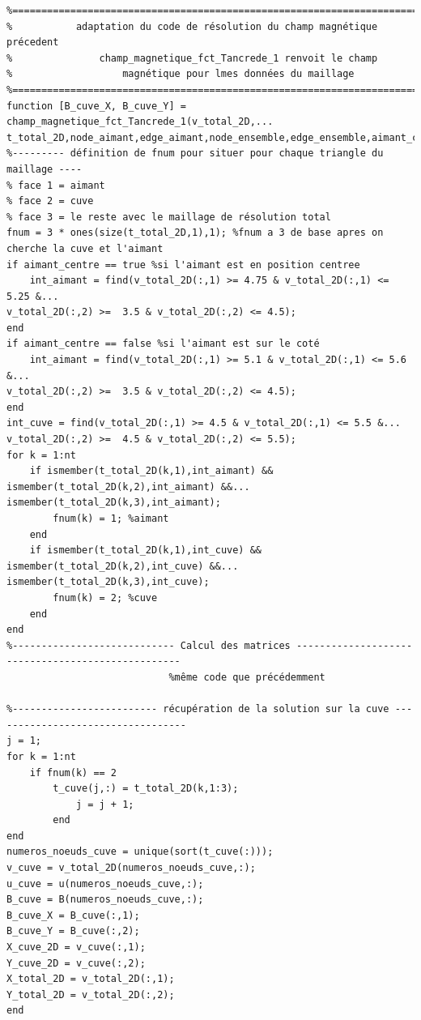 \documentclass[a4paper,12pt,titlepage]{report}
\begin{document}
\begin{onehalfspace}
\begin{appendix}
\begin{verbatim}
%==============================================================================
% 			adaptation du code de résolution du champ magnétique précedent
%				champ_magnetique_fct_Tancrede_1 renvoit le champ 
%					magnétique pour lmes données du maillage
%==============================================================================
function [B_cuve_X, B_cuve_Y] = champ_magnetique_fct_Tancrede_1(v_total_2D,...
t_total_2D,node_aimant,edge_aimant,node_ensemble,edge_ensemble,aimant_centre)
%--------- définition de fnum pour situer pour chaque triangle du maillage ----
% face 1 = aimant
% face 2 = cuve
% face 3 = le reste avec le maillage de résolution total
fnum = 3 * ones(size(t_total_2D,1),1); %fnum a 3 de base apres on cherche la cuve et l'aimant
if aimant_centre == true %si l'aimant est en position centree
    int_aimant = find(v_total_2D(:,1) >= 4.75 & v_total_2D(:,1) <= 5.25 &...
v_total_2D(:,2) >=  3.5 & v_total_2D(:,2) <= 4.5);
end
if aimant_centre == false %si l'aimant est sur le coté
    int_aimant = find(v_total_2D(:,1) >= 5.1 & v_total_2D(:,1) <= 5.6 &... 
v_total_2D(:,2) >=  3.5 & v_total_2D(:,2) <= 4.5);
end
int_cuve = find(v_total_2D(:,1) >= 4.5 & v_total_2D(:,1) <= 5.5 &... 
v_total_2D(:,2) >=  4.5 & v_total_2D(:,2) <= 5.5);
for k = 1:nt
	if ismember(t_total_2D(k,1),int_aimant) && ismember(t_total_2D(k,2),int_aimant) &&... 
ismember(t_total_2D(k,3),int_aimant);
    	fnum(k) = 1; %aimant
    end
   	if ismember(t_total_2D(k,1),int_cuve) && ismember(t_total_2D(k,2),int_cuve) &&... 
ismember(t_total_2D(k,3),int_cuve);
        fnum(k) = 2; %cuve
    end
end
%---------------------------- Calcul des matrices --------------------------------------------------
 							%même code que précédemment 

%------------------------- récupération de la solution sur la cuve ----------------------------------
j = 1;
for k = 1:nt
	if fnum(k) == 2
		t_cuve(j,:) = t_total_2D(k,1:3);
            j = j + 1;
        end
end
numeros_noeuds_cuve = unique(sort(t_cuve(:)));
v_cuve = v_total_2D(numeros_noeuds_cuve,:);
u_cuve = u(numeros_noeuds_cuve,:);
B_cuve = B(numeros_noeuds_cuve,:);
B_cuve_X = B_cuve(:,1);
B_cuve_Y = B_cuve(:,2);
X_cuve_2D = v_cuve(:,1);
Y_cuve_2D = v_cuve(:,2);
X_total_2D = v_total_2D(:,1);
Y_total_2D = v_total_2D(:,2);
end
\end{verbatim}


\end{appendix}
\end{onehalfspace}
\end{document}
